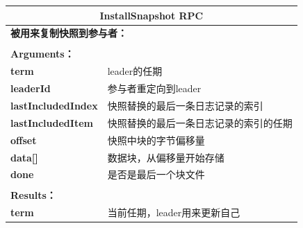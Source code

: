 \documentclass[journal]{IEEEtran}
\begin{document}
\begin{table}[htp]
\begin{center}
\begin{tabular}{|p{2.5cm}p{5.5cm}|}
\hline
\multicolumn{2}{|c|}{\textbf{InstallSnapshot RPC}}  \\
\hline
\multicolumn{2}{|l|}{\textbf{被用来复制快照到参与者：}} \\
&\\
\multicolumn{2}{|l|}{\textbf{Arguments：}} \\
\textbf{term} & leader的任期\\
\textbf{leaderId} & 参与者重定向到leader\\
\textbf{lastIncludedIndex} & 快照替换的最后一条日志记录的索引 \\ 
\textbf{lastIncludedItem} & 快照替换的最后一条日志记录的索引的任期 \\
\textbf{offset} & 快照中块的字节偏移量 \\
\textbf{data[]} & 数据块，从偏移量开始存储 \\
\textbf{done} & 是否是最后一个块文件 \\
&\\
\multicolumn{2}{|l|}{\textbf{Results：}} \\
\textbf{term} & 当前任期，leader用来更新自己\\


\end{tabular}
\end{center}
\end{table}
\end{document}
